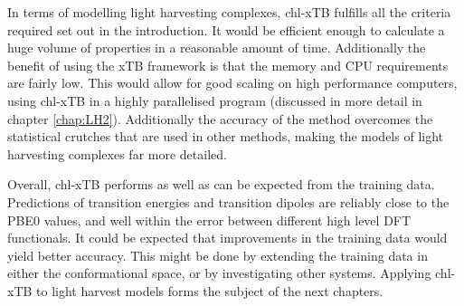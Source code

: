 In terms of modelling light harvesting complexes, chl-xTB fulfills all the criteria
required set out in the introduction. It would be efficient enough to calculate
a huge volume of properties in a reasonable amount of time. Additionally the benefit
of using the xTB framework is that the memory and CPU requirements are fairly low.
This would allow for good scaling on high performance computers, using chl-xTB in
a highly parallelised program (discussed in more detail in chapter \ref{chap:LH2}).
Additionally the accuracy of the method overcomes the statistical crutches that
are used in other methods, making the models of light harvesting complexes far more
detailed.

Overall, chl-xTB performs as well as can be expected from the training data. Predictions
of transition energies and transition dipoles are reliably close to the PBE0 values,
and well within the error between different high level DFT functionals. It could 
be expected that improvements in the training data would yield better accuracy.
This might be done by extending the training data in either the conformational space,
or by investigating other systems. Applying chl-xTB to light harvest models forms
the subject of the next chapters.

